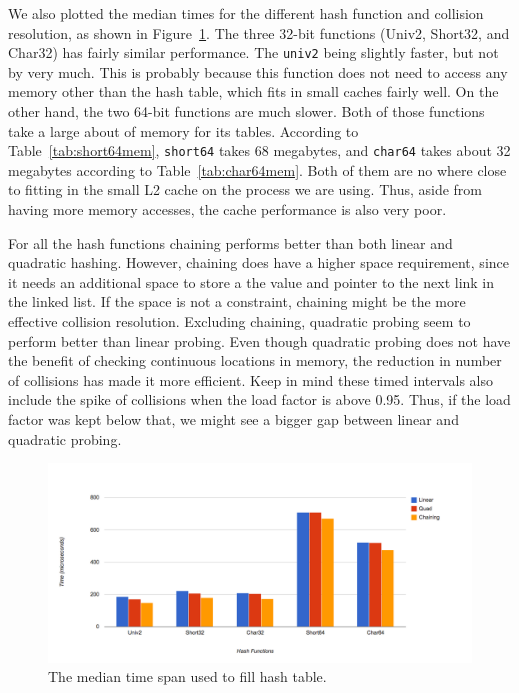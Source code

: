 \documentclass[11pt]{article}
\begin{document}
We also plotted the median times for the different hash function and collision resolution,
as shown in Figure~\ref{fig:timemedian}. The three 32-bit functions 
(Univ2, Short32, and Char32) has fairly similar performance. The \texttt{univ2} 
being slightly faster, but not by very much. This is probably because this 
function does not need to access any memory other than the hash table, 
which fits in small caches fairly well. On the other hand, the two 64-bit functions are much slower.
Both of those functions take a large about of memory for its tables. According 
to Table~\ref{tab:short64mem}, \texttt{short64} takes 68 megabytes, 
and \texttt{char64} takes about 32 megabytes according to Table~\ref{tab:char64mem}.
Both of them are no where close to fitting in the small L2 cache on the process we are using.
Thus, aside from having more memory accesses, the cache performance is also very poor.

For all the hash functions chaining performs better than both linear and quadratic hashing. 
However, chaining does have a higher space requirement, since it needs an 
additional space to store a the value and pointer to the next link in the linked list. 
If the space is not a constraint, chaining might be the more effective collision resolution.
Excluding chaining, quadratic probing seem to perform better than linear probing. 
Even though quadratic probing does not have the benefit of checking continuous
locations in memory, the reduction in number of collisions has made it more efficient.
Keep in mind these timed intervals also include the spike of collisions when the
load factor is above 0.95. Thus, if the load factor was kept below that, 
we might see a bigger gap between linear and quadratic probing.


\begin{figure}
                \centering
                \includegraphics[width=\textwidth]{time-median.png}
              \caption{The median time span used to fill hash table.}
              \label{fig:timemedian}
\end{figure}
\end{document}

